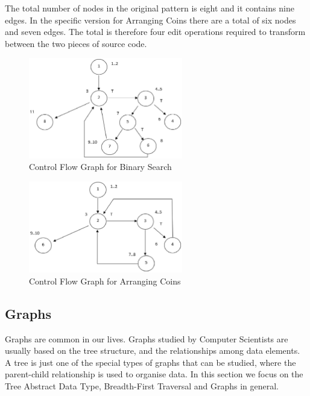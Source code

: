 \documentclass[conference]{IEEEtran}
\begin{document}
\par The total number of nodes in the original pattern is eight and it contains nine edges. In the specific version for Arranging Coins there are a total of six nodes and seven edges. The total is therefore four edit operations required to transform between the two pieces of source code.
 \begin{figure}[H]
\includegraphics[width=0.6\textwidth]{CFGBinarySearch}
\caption{Control Flow Graph for Binary Search}
\label{fig:cfgbinarysearch}
\end{figure}
 \begin{figure}[H]
\includegraphics[width=0.6\textwidth]{CFGArrangingCoins}
\caption{Control Flow Graph for Arranging Coins}
\label{fig:cfgbinarysearch}
\end{figure}

	
	\subsection{Graphs}
	Graphs are common in our lives. Graphs studied by Computer Scientists are usually based on the tree structure, and the relationships among data elements. A tree is just one of the special types of graphs that can be studied, where the parent-child relationship is used to organise data. In this section we focus on the Tree Abstract Data Type, Breadth-First Traversal and Graphs in general. \\
\end{document}
